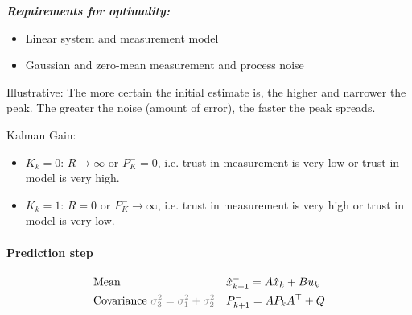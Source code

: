 \begin{multicols*}{2}
\textit{\textbf{Requirements for optimality:}}
\begin{itemize}
	\item Linear system and measurement model
	\item Gaussian and zero-mean measurement and process noise
\end{itemize}

Illustrative:
The more certain the initial estimate is, the higher and narrower the peak.
The greater the noise (amount of error), the faster the peak spreads.\par

Kalman Gain:
\begin{itemize}
	\item $K_k=0$: $R \rightarrow \infty$ or $P_K^- = 0$, i.e. trust in measurement is very low or trust in model is very high.
	\item $K_k=1$: $R = 0$ or $P_K^- \rightarrow \infty$, i.e. trust in measurement is very high or trust in model is very low.
\end{itemize}

\paragraph{Prediction step}
\begin{align*}
	&\text{Mean} && \hat{x}_{k+1}^- = A \hat{x}_{k} + B u_k  \\
	&\text{Covariance } \textcolor{gray}{\sigma_3^2 = \sigma_1^2 + \sigma_2^2} && P_{k+1}^- = A P_k A^\top + Q 
\end{align*}


\end{multicols*}
